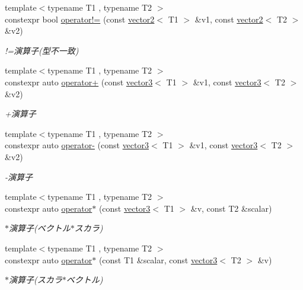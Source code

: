 \begin{DoxyCompactItemize}
{\footnotesize template$<$typename T1 , typename T2 $>$ }\\constexpr bool \mbox{\hyperlink{namespacesaki_a0d7159e145464e2deab2de2a76be1c00}{operator!=}} (const \mbox{\hyperlink{classsaki_1_1vector2}{vector2}}$<$ T1 $>$ \&v1, const \mbox{\hyperlink{classsaki_1_1vector2}{vector2}}$<$ T2 $>$ \&v2)
\begin{DoxyCompactList}\small\item\em !=演算子(型不一致) \end{DoxyCompactList}\item 
{\footnotesize template$<$typename T1 , typename T2 $>$ }\\constexpr auto \mbox{\hyperlink{namespacesaki_af2eb9872710ab7ebca5e7a665f1a7cd7}{operator+}} (const \mbox{\hyperlink{classsaki_1_1vector3}{vector3}}$<$ T1 $>$ \&v1, const \mbox{\hyperlink{classsaki_1_1vector3}{vector3}}$<$ T2 $>$ \&v2)
\begin{DoxyCompactList}\small\item\em +演算子 \end{DoxyCompactList}\item 
{\footnotesize template$<$typename T1 , typename T2 $>$ }\\constexpr auto \mbox{\hyperlink{namespacesaki_a8697755777c25ac12687ea8804f80331}{operator-\/}} (const \mbox{\hyperlink{classsaki_1_1vector3}{vector3}}$<$ T1 $>$ \&v1, const \mbox{\hyperlink{classsaki_1_1vector3}{vector3}}$<$ T2 $>$ \&v2)
\begin{DoxyCompactList}\small\item\em -\/演算子 \end{DoxyCompactList}\item 
{\footnotesize template$<$typename T1 , typename T2 $>$ }\\constexpr auto \mbox{\hyperlink{namespacesaki_abd9716c5a5ccdc1cafb975df8897acb3}{operator$\ast$}} (const \mbox{\hyperlink{classsaki_1_1vector3}{vector3}}$<$ T1 $>$ \&v, const T2 \&scalar)
\begin{DoxyCompactList}\small\item\em $\ast$演算子(ベクトル$\ast$スカラ) \end{DoxyCompactList}\item 
{\footnotesize template$<$typename T1 , typename T2 $>$ }\\constexpr auto \mbox{\hyperlink{namespacesaki_ab3e41594237dcaac47a2a27ed97f48f6}{operator$\ast$}} (const T1 \&scalar, const \mbox{\hyperlink{classsaki_1_1vector3}{vector3}}$<$ T2 $>$ \&v)
\begin{DoxyCompactList}\small\item\em $\ast$演算子(スカラ$\ast$ベクトル) \end{DoxyCompactList}\item 

\end{DoxyCompactItemize}
